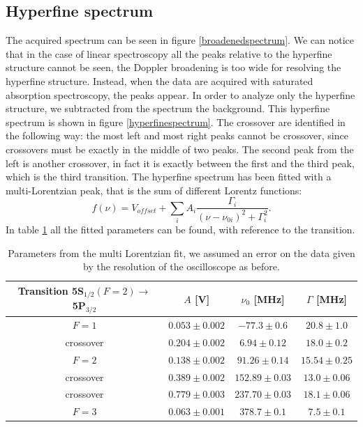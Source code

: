 \documentclass[a4paper,10pt]{article}
\begin{document}
\subsection{Hyperfine spectrum}
The acquired spectrum can be seen in figure \ref{broadenedspectrum}. We can notice that in the case of linear spectroscopy all the peaks relative to the hyperfine structure cannot be seen, the Doppler broadening is too wide for resolving the hyperfine structure. Instead, when the data are acquired with saturated absorption spectroscopy, the peaks appear. In order to analyze only the hyperfine structure, we subtracted from the spectrum the background. This hyperfine spectrum is shown in figure \ref{hyperfinespectrum}. The crossover are identified in the following way: the most left and most right peaks cannot be crossover, since crossovers must be exactly in the middle of two peaks. The second peak from the left is another crossover, in fact it is exactly between the first and the third peak, which is the third transition.
The hyperfine spectrum has been fitted with a multi-Lorentzian peak, that is the sum of different Lorentz functions:
\[f(\nu) = V_{offset}+\sum_{i} A_i \frac{\Gamma_i}{(\nu-\nu_{0i})^2 + \Gamma_i^2}. \]
In table \ref{parametersfit} all the fitted parameters can be found, with reference to the transition.

\begin{table}[H]
      \centering
\begin{tabular}{c|c|c|c}
          Transition 5S$_{1/2}(F=2)\to$ 5P$_{3/2}$ & $A$ [V] & $\nu_0$ [MHz] & $\Gamma$ [MHz]\\
           \hline
           $F=1$ & $  0.053\pm  0.002$ & $  -77.3\pm 0.6 $ & $20.8\pm 1.0$ \\
              crossover & $  0.204\pm  0.002$ & $   6.94\pm 0.12$ & $18.0\pm 0.2 $ \\
           $F=2$ & $  0.138\pm  0.002$ & $  91.26\pm 0.14$ & $ 15.54\pm 0.25$ \\
           crossover & $  0.389\pm  0.002$ & $ 152.89 \pm 0.03 $ & $ 13.0\pm 0.06$ \\
           crossover & $  0.779\pm  0.003$ & $ 237.70\pm 0.03 $ & $ 18.1\pm 0.06$ \\
           $F=3$ & $  0.063\pm  0.001$ & $ 378.7 \pm 0.1 $ & $ 7.5\pm 0.1$ \\
           \hline
        \end{tabular}
        \caption{Parameters from the multi Lorentzian fit, we assumed an error on the data given by the resolution of the oscilloscope as before.}\label{parametersfit}
\end{table}
 
\end{document}
